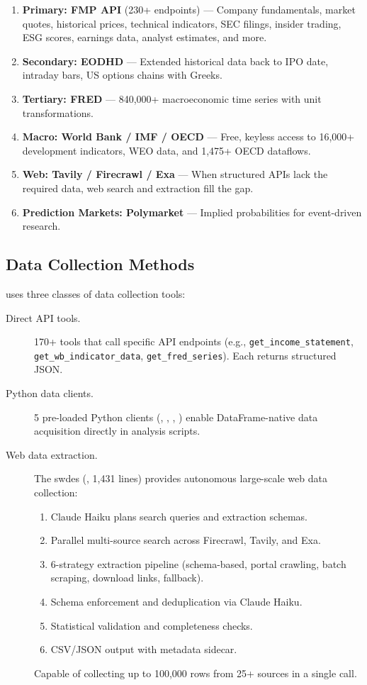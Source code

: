 \begin{enumerate}
  \item \textbf{Primary: FMP API} (230+ endpoints) --- Company fundamentals, market quotes, historical prices, technical indicators, SEC filings, insider trading, ESG scores, earnings data, analyst estimates, and more.
  \item \textbf{Secondary: EODHD} --- Extended historical data back to IPO date, intraday bars, US options chains with Greeks.
  \item \textbf{Tertiary: FRED} --- 840,000+ macroeconomic time series with unit transformations.
  \item \textbf{Macro: World Bank / IMF / OECD} --- Free, keyless access to 16,000+ development indicators, WEO data, and 1,475+ OECD dataflows.
  \item \textbf{Web: Tavily / Firecrawl / Exa} --- When structured APIs lack the required data, web search and extraction fill the gap.
  \item \textbf{Prediction Markets: Polymarket} --- Implied probabilities for event-driven research.
\end{enumerate}

\subsection{Data Collection Methods}

\turing uses three classes of data collection tools:

\begin{description}
  \item[Direct API tools.] 170+ tools that call specific API endpoints (e.g., \texttt{get\_income\_statement}, \texttt{get\_wb\_indicator\_data}, \texttt{get\_fred\_series}). Each returns structured JSON.

  \item[Python data clients.] 5 pre-loaded Python clients (, , , ) enable DataFrame-native data acquisition directly in analysis scripts.

  \item[Web data extraction.] The \gls{swdes} (, 1,431 lines) provides autonomous large-scale web data collection:
  \begin{enumerate}
    \item Claude Haiku plans search queries and extraction schemas.
    \item Parallel multi-source search across Firecrawl, Tavily, and Exa.
    \item 6-strategy extraction pipeline (schema-based, portal crawling, batch scraping, download links, fallback).
    \item Schema enforcement and deduplication via Claude Haiku.
    \item Statistical validation and completeness checks.
    \item CSV/JSON output with metadata sidecar.
  \end{enumerate}
  Capable of collecting up to 100,000 rows from 25+ sources in a single call.
\end{description}

